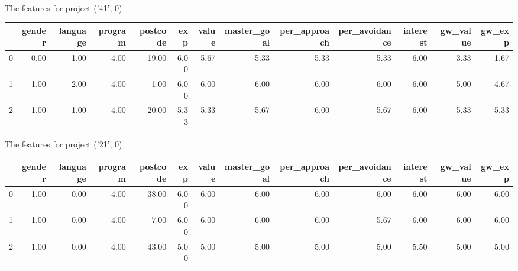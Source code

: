 \documentclass[7pt]{article}
\begin{document}
\begin{landscape}
The features for project ('41', 0)\newline
\begin{tabular}{lrrrrrrrrrrrr}
\toprule
{} &  gender &  language &  program &  postcode &  exp &  value &  master\_goal &  per\_approach &  per\_avoidance &  interest &  gw\_value &  gw\_exp \\
\midrule
0 &    0.00 &      1.00 &     4.00 &     19.00 & 6.00 &   5.67 &         5.33 &          5.33 &           5.33 &      6.00 &             3.33 &           1.67 \\
1 &    1.00 &      2.00 &     4.00 &      1.00 & 6.00 &   6.00 &         6.00 &          6.00 &           6.00 &      6.00 &             5.00 &           4.67 \\
2 &    1.00 &      1.00 &     4.00 &     20.00 & 5.33 &   5.33 &         5.67 &          6.00 &           5.67 &      6.00 &             5.33 &           5.33 \\
\bottomrule
\end{tabular}

The features for project ('21', 0)\newline
\begin{tabular}{lrrrrrrrrrrrr}
\toprule
{} &  gender &  language &  program &  postcode &  exp &  value &  master\_goal &  per\_approach &  per\_avoidance &  interest &  gw\_value &  gw\_exp \\
\midrule
0 &    1.00 &      0.00 &     4.00 &     38.00 & 6.00 &   6.00 &         6.00 &          6.00 &           6.00 &      6.00 &             6.00 &           6.00 \\
1 &    1.00 &      0.00 &     4.00 &      7.00 & 6.00 &   6.00 &         6.00 &          6.00 &           5.67 &      6.00 &             6.00 &           6.00 \\
2 &    1.00 &      0.00 &     4.00 &     43.00 & 5.00 &   5.00 &         5.00 &          5.00 &           5.00 &      5.50 &             5.00 &           5.00 \\
\bottomrule
\end{tabular}


\end{landscape}
\end{document}
